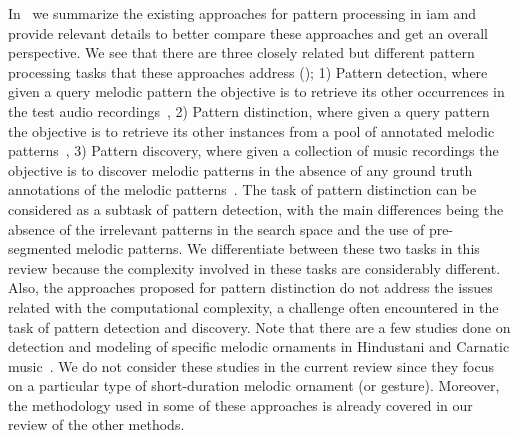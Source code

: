 In~ we summarize the existing approaches for pattern processing in \gls{iam} and provide relevant details to better compare these approaches and get an overall perspective. We see that there are three closely related but different pattern processing tasks that these approaches address (); 1) Pattern detection, where given a query melodic pattern the objective is to retrieve its other occurrences in the test audio recordings~\citep{Ross2012,Ross2012b,Ishwar2013,dutta2014modified,ganguli2015efficient}, 2) Pattern distinction, where given a query pattern the objective is to retrieve its other instances from a pool of annotated melodic patterns~\citep{ishwar2012motivic,rao2013distinguishing,Rao2014}, 3) Pattern discovery, where given a collection of music recordings the objective is to discover melodic patterns in the absence of any ground truth annotations of the melodic patterns~\citep{Dutta2014}. The task of pattern distinction can be considered as a subtask of pattern detection, with the main differences being the absence of the irrelevant patterns in the search space and the use of pre-segmented melodic patterns. We differentiate between these two tasks in this review because the complexity involved in these tasks are considerably different. Also, the approaches proposed for pattern distinction do not address the issues related with the computational complexity, a challenge often encountered in the task of pattern detection and discovery. Note that there are a few studies done on detection and modeling of specific melodic ornaments in Hindustani and Carnatic music~\citep{Subramanian2012,Datta2007,narayan2014detection,pratyush_2010}. We do not consider these studies in the current review since they focus on a particular type of short-duration melodic ornament (or gesture). Moreover, the methodology used in some of these approaches is already covered in our review of the other methods.


